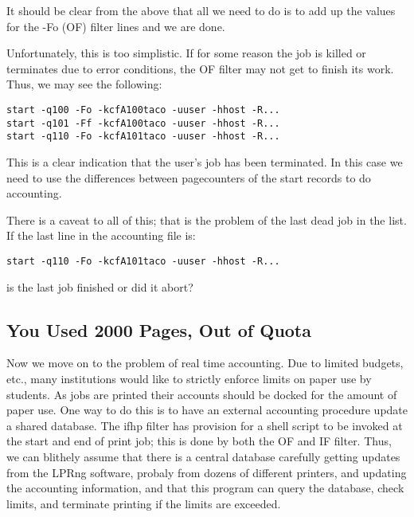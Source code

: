 \documentclass[a4paper]{article}
\begin{document}
It should be clear from the above that all we need to do is to add up
the values for the -Fo (OF) filter lines and we are done.

Unfortunately,  this is too simplistic.  If for some reason the job is
killed or terminates due to error conditions,  the OF filter may not
get to finish its work.  Thus,  we may see the following:
\begin{tscreen}
\begin{verbatim}
start -q100 -Fo -kcfA100taco -uuser -hhost -R...  
start -q101 -Ff -kcfA100taco -uuser -hhost -R...  
start -q110 -Fo -kcfA101taco -uuser -hhost -R...
\end{verbatim}
\end{tscreen}


This is a clear indication that the user's job has been terminated.  In
this case we need to use the differences between pagecounters of the start
records to do accounting.

There is a caveat to all of this;  that is the problem of the last dead
job in the list.  If the last line in the accounting file is:
\begin{tscreen}
\begin{verbatim}
start -q110 -Fo -kcfA101taco -uuser -hhost -R...
\end{verbatim}
\end{tscreen}

is the last job finished or did it abort?


\subsection{You Used 2000 Pages, Out of Quota}

Now we move on to the problem of real time accounting.  Due to limited
budgets, etc., many institutions would like to strictly enforce limits
on paper use by students. As jobs are printed their accounts should be
docked for the amount of paper use.  One way to do this is to have an
external accounting procedure update a shared database.  The
ifhp
filter
has provision for a shell script to be invoked
at the start and end of print job;
this is done by both the OF and IF filter.  Thus, we can blithely
assume that there is a central database carefully getting updates
from the LPRng software, probaly from dozens of different printers,
and updating the accounting information,
and that this program can query the database,
check limits,
and terminate printing if the limits are exceeded.
\end{document}
